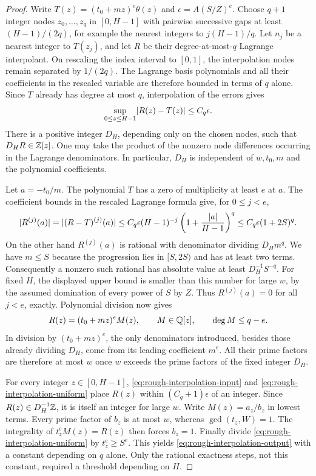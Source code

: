 \begin{proof}
Write $T(z)=(t_0+mz)^e\theta(z)$ and
$\epsilon=A(S/Z)^e$.  Choose $q+1$ integer nodes
$z_0,\ldots,z_q$ in $[0,H-1]$ with pairwise successive gaps at least
$(H-1)/(2q)$, for example the nearest integers to $j(H-1)/q$.
Let $n_j$ be a nearest integer to $T(z_j)$, and let $R$ be their
degree-at-most-$q$ Lagrange interpolant.  On rescaling the index interval
to $[0,1]$, the interpolation nodes remain separated by $1/(2q)$.
The Lagrange basis polynomials and all their coefficients in the
rescaled variable are therefore bounded in terms of $q$ alone.  Since
$T$ already has degree at most $q$, interpolation of the errors gives
\begin{equation}
 \sup_{0\leq z\leq H-1}\lvert R(z)-T(z)\rvert\leq C_q\epsilon.
 \label{eq:rough-interpolation-uniform}
\end{equation}
There is a positive integer $D_H$, depending only on the chosen nodes,
such that $D_HR\in\mathbb Z[z]$.  One may take the product of the nonzero
node differences occurring in the Lagrange denominators.  In particular,
$D_H$ is independent of $w,t_0,m$ and the polynomial coefficients.

Let $a=-t_0/m$.  The polynomial $T$ has a zero of multiplicity at least
$e$ at $a$.  The coefficient bounds in the rescaled Lagrange formula
give, for $0\leq j<e$,
\[
 \lvert R^{(j)}(a)\rvert
  =\lvert(R-T)^{(j)}(a)\rvert
  \leq C_q\epsilon(H-1)^{-j}
          \left(1+\frac{\lvert a\rvert}{H-1}\right)^q
  \leq C_q\epsilon(1+2S)^q.
\]
On the other hand $R^{(j)}(a)$ is rational with denominator dividing
$D_Hm^q$.  We have $m\leq S$ because the progression lies in $[S,2S)$
and has at least two terms.  Consequently a nonzero such rational has
absolute value at least $D_H^{-1}S^{-q}$.  For fixed $H$, the displayed
upper bound is smaller than this number for large $w$, by the assumed
domination of every power of $S$ by $Z$.  Thus
$R^{(j)}(a)=0$ for all $j<e$, exactly.  Polynomial division now gives
\begin{equation}
 R(z)=(t_0+mz)^e M(z),\qquad M\in\mathbb Q[z],\qquad\deg M\leq q-e.
 \label{eq:rough-exact-divisibility}
\end{equation}
In division by $(t_0+mz)^e$, the only denominators introduced, besides
those already dividing $D_H$, come from its leading coefficient $m^e$.
All their prime factors are therefore at most $w$ once $w$ exceeds the
prime factors of the fixed integer $D_H$.

For every integer $z\in[0,H-1]$, \eqref{eq:rough-interpolation-input}
and \eqref{eq:rough-interpolation-uniform} place $R(z)$ within
$(C_q+1)\epsilon$ of an integer.  Since $R(z)\in D_H^{-1}\mathbb Z$, it is
itself an integer for large $w$.  Write $M(z)=a_z/b_z$ in lowest terms.
Every prime factor of $b_z$ is at most $w$, whereas
$\gcd(t_z,W)=1$.  The integrality of $t_z^eM(z)=R(z)$ then forces
$b_z=1$.  Finally divide \eqref{eq:rough-interpolation-uniform} by
$t_z^e\geq S^e$.  This yields
\eqref{eq:rough-interpolation-output} with a constant depending on $q$
alone.  Only the rational exactness steps, not this constant, required
a threshold depending on $H$.
\end{proof}

